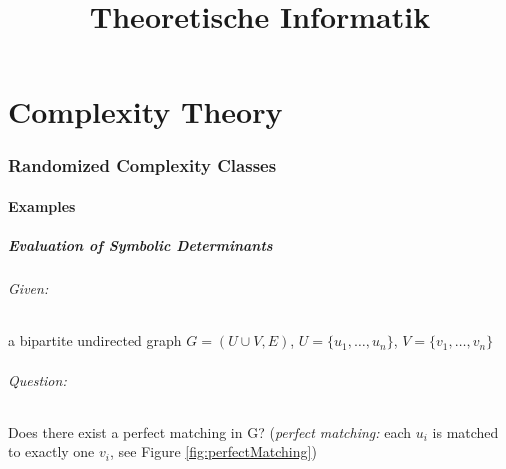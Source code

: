 \documentclass[11pt]{article}
\theoremstyle{definition}
\theoremstyle{definition}
\begin{document}
\setlength{\parindent}{0pt}


\title{Theoretische Informatik}
\author{}
\date {}

\maketitle

\tableofcontents

\newpage

\part{Complexity Theory}
\section{Randomized Complexity Classes}

\subsection{Examples}

\subsubsection{Evaluation of Symbolic Determinants}


\paragraph{Given:} a bipartite undirected graph $ G = (U \cup V, E) $, $ U = \{u_1, \dots, u_n \} $, $ V = \{ v_1, \dots, v_n \} $

\paragraph{Question:} Does there exist a perfect matching in G? (\textit{perfect matching:} each $ u_i $ is matched to exactly one $ v_i $, see Figure \ref{fig:perfectMatching})

\end{document}
